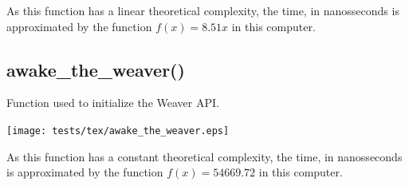 \documentclass{article}
\begin{document}
As this function has a linear theoretical
complexity, the time, in nanosseconds is 
approximated by the function $f(x)=8.51x$
in this computer.
\subsection{awake\_the\_weaver()}
Function used to initialize the Weaver API.

\texttt{[image: tests/tex/awake\_the\_weaver.eps]}

As this function has a constant theoretical
complexity, the time, in nanosseconds is 
approximated by the function $f(x)=54669.72$
in this computer.
\end{document}
